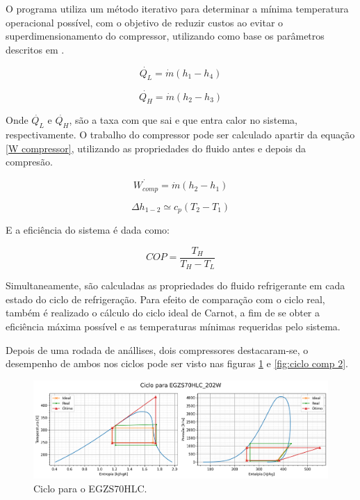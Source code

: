 \newpage

O programa utiliza um método iterativo para determinar a  mínima temperatura operacional possível, com o objetivo de reduzir custos ao evitar o superdimensionamento do compressor, utilizando como base os parâmetros descritos em \cite{paper_referencia}.

\begin{equation}
    \dot{Q_L} = \dot{m}(h_1-h_4)
    \label{QL}
\end{equation}

\begin{equation}
    \dot{Q_H} = \dot{m}(h_2-h_3)
    \label{QH}
\end{equation}

    Onde $\dot{Q_L}$ e $\dot{Q_H}$, são  a taxa com que sai e que entra calor no sistema, respectivamente. O trabalho do compressor pode ser calculado apartir da equação \ref{W compressor}, utilizando as propriedades do fluido antes e depois da compresão.

\begin{equation}
    \dot{W_{comp}} = \dot{m}(h_2-h_1)
    \label{W compressor}
\end{equation}

\begin{equation}
    \Delta h_{1-2} \simeq  c_p (T_2-T_1)
    \label{simplificacao entalpia}
\end{equation}

    E a eficiência do sistema é dada como:

\begin{equation}
    COP = \frac{T_H}{T_H - T_L}
    \label{COP carnot}
\end{equation}

\newpage    

Simultaneamente, são calculadas as propriedades do fluido refrigerante em cada estado do ciclo de refrigeração. Para efeito de comparação com o ciclo real, também é realizado o cálculo do ciclo ideal de Carnot, a fim de se obter a eficiência máxima possível e as temperaturas mínimas requeridas pelo sistema.

Depois de uma rodada de anállises, dois compressores destacaram-se, o desempenho de ambos nos ciclos pode ser visto nas figuras \ref{fig:ciclo comp 1} e \ref{fig:ciclo comp 2}.

\begin{figure}[ht]
    \centering
    \includegraphics[width=0.9\linewidth]{Imagens/Desenvolvimento/ciclo_EGZS70HLC_202W.png}
    \caption{Ciclo para o EGZS70HLC.}
    \label{fig:ciclo comp 1}
\end{figure}

